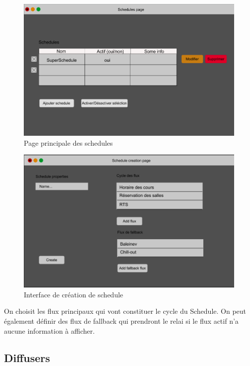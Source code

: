 \documentclass[french]{article}
\begin{document}
	\begin{figure}[h]
		\centering
		\includegraphics[scale=0.4]{mockup/m_schedules_page}
		\caption{Page principale des schedules}
		\label{fig:schedulePage}
	\end{figure}
	
	\begin{figure}[h]
		\centering
		\includegraphics[scale=0.4]{mockup/m_schedule_creation}
		\caption{Interface de création de schedule}
		\label{fig:scheduleCreation}
	\end{figure}
	
	On choisit les flux principaux qui vont constituer le cycle du Schedule. On peut également définir des flux de fallback qui prendront le relai si le flux actif n'a aucune information à afficher.

\newpage
\subsection{Diffusers}
\end{document}
